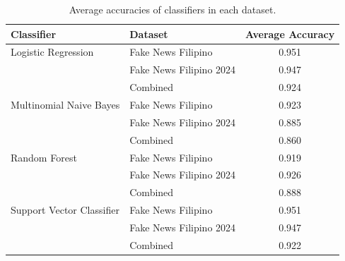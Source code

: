 \begin{table}[ht]
    \centering
    \begin{tabular}{|l|l|c|}
    \hline Classifier & Dataset & Average Accuracy \\
    \hline
    Logistic Regression & Fake News Filipino & 0.951 \\
    & Fake News Filipino 2024 & 0.947\\
    & Combined & 0.924 \\
    \hline
    Multinomial Naive Bayes & Fake News Filipino & 0.923 \\
    & Fake News Filipino 2024 & 0.885 \\
    & Combined & 0.860 \\
    \hline
    Random Forest & Fake News Filipino & 0.919 \\
    & Fake News Filipino 2024 & 0.926 \\
    & Combined & 0.888 \\  
    \hline
    Support Vector Classifier & Fake News Filipino & 0.951 \\
    & Fake News Filipino 2024 & 0.947 \\
    & Combined & 0.922\\
    \hline
    \end{tabular}
    \caption{Average accuracies of classifiers in each dataset.}
    \label{tab::AverageAccuracies}
\end{table}



    

